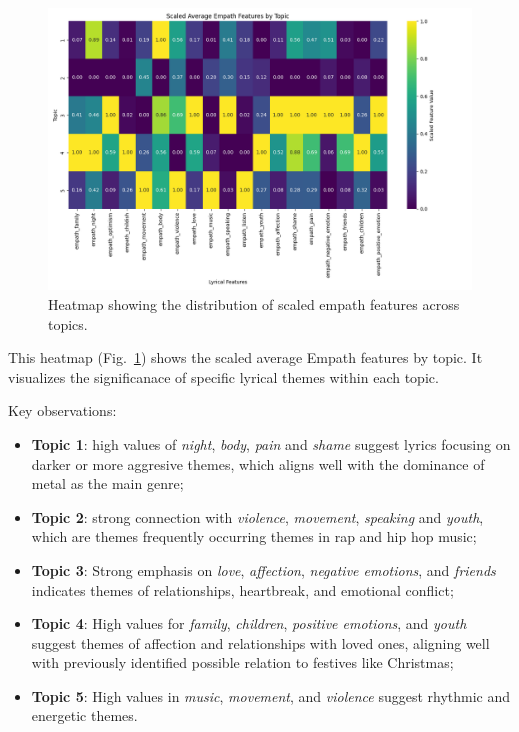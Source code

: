 \begin{center}
\begin{figure}[H]
  \centering
  \includegraphics[width=6in]{img/lda_empath_features.png}
  \caption{Heatmap showing the distribution of scaled empath features across topics.}
  \label{Figure:lda_empath_features}
\end{figure}
\end{center}


This heatmap (Fig.~\ref{Figure:lda_empath_features}) shows the scaled average
Empath features by topic. It visualizes the significanace of specific lyrical
themes within each topic. 

\noindent \noindent Key observations:

\begin{itemize}
  \item \textbf{Topic 1}: high values of \textit{night}, \textit{body},
    \textit{pain} and \textit{shame} suggest lyrics focusing on darker or more
    aggresive themes, which aligns well with the dominance of metal as the main
    genre;
  \item \textbf{Topic 2}: strong connection with \textit{violence},
    \textit{movement}, \textit{speaking} and \textit{youth}, which are themes
    frequently occurring themes in rap and hip hop music;
  \item \textbf{Topic 3}: Strong emphasis on \textit{love}, \textit{affection},
    \textit{negative emotions}, and \textit{friends} indicates themes of
    relationships, heartbreak, and emotional conflict;
  \item \textbf{Topic 4}: High values for \textit{family}, \textit{children},
    \textit{positive emotions}, and \textit{youth} suggest themes of affection
    and relationships with loved ones, aligning well with previously identified
    possible relation to festives like Christmas;
  \item \textbf{Topic 5}: High values in \textit{music}, \textit{movement}, and
    \textit{violence} suggest rhythmic and energetic themes.
\end{itemize}

